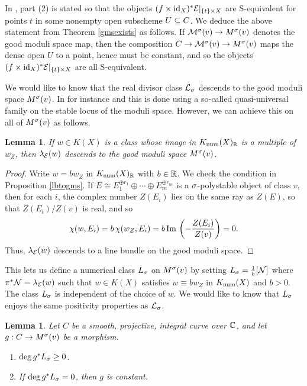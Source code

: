 \documentclass[letterpaper,12pt]{amsart}
\newtheorem{lem}[thm]{Lemma}
\theoremstyle{remark}
\begin{document}
In \cite{BM}, part (2) is stated so that the objects $(f \times \mathrm{id}_X)^*\mathcal{E}|_{\{t\} \times X}$ are S-equivalent for points $t$ in some nonempty open subscheme $U \subseteq C$. We deduce the above statement from Theorem \ref{gmsexists} as follows. If $\mathcal{M}^\sigma(v) \to M^\sigma(v)$ denotes the good moduli space map, then the composition $C \to \mathcal{M}^\sigma(v) \to M^\sigma(v)$ maps the dense open $U$ to a point, hence must be constant, and so the objects $(f\times \mathrm{id}_X)^*\mathcal{E}|_{\{t\} \times X}$ are all S-equivalent. 

We would like to know that the real divisor class $\mathcal{L}_\sigma$ descends to the good moduli space $M^\sigma(v)$. In for instance \cite{BM} and \cite{nuer} this is done using a so-called quasi-universal family on the stable locus of the moduli space. However, we can achieve this on all of $M^\sigma(v)$ as follows.
\begin{lem}\label{nefdescendtogms}
    If $w \in K(X)$ is a class whose image in $K_{\mathrm{num}}(X)_{\mathbb{R}}$ is a multiple of $w_Z$, then $\lambda_{\mathcal{E}}(w)$ descends to the good moduli space $M^\sigma(v)$.
\end{lem} 
\begin{proof}
    Write $w = b w_Z$ in $K_{\mathrm{num}}(X)_{\mathbb{R}}$ with $b \in \mathbb{R}$. We check the condition in Proposition \ref{lbtogms}. If $E \cong E_1^{\oplus r_1} \oplus \cdots \oplus E_m^{\oplus r_m}$ is a $\sigma$-polystable object of class $v$, then for each $i$, the complex number $Z(E_i)$ lies on the same ray as $Z(E)$, so that $Z(E_i)/Z(v)$ is real, and so
    \[ \chi(w, E_i) = b\,\chi(w_Z, E_i) = b\,\mathrm{Im}\,\left(-\frac{Z(E_i)}{Z(v)}\right) = 0. \]
    Thus, $\lambda_{\mathcal{E}}(w)$ descends to a line bundle on the good moduli space.    
\end{proof}
This lets us define a numerical class $L_\sigma$ on $M^\sigma(v)$ by setting $L_\sigma = \frac{1}{b}[\mathcal{N}]$ where $\pi^*\mathcal{N} = \lambda_{\mathcal{E}}(w)$ such that $w \in K(X)$ satisfies $w \equiv b w_Z$ in $K_{\mathrm{num}}(X)$ and $b > 0$. The class $L_\sigma$ is independent of the choice of $w$. We would like to know that $L_\sigma$ enjoys the same positivity properties as $\mathcal{L}_\sigma$.
\begin{lem}\label{gmsnef}
    Let $C$ be a smooth, projective, integral curve over $\mathbb{C}$, and let $g: C \to M^\sigma(v)$ be a morphism.
    \begin{enumerate}[(1')]
        \item $\deg g^* L_\sigma \ge 0$.
        \item If $\deg g^* L_\sigma = 0$, then $g$ is constant.
    \end{enumerate}
\end{lem}
\end{document}

